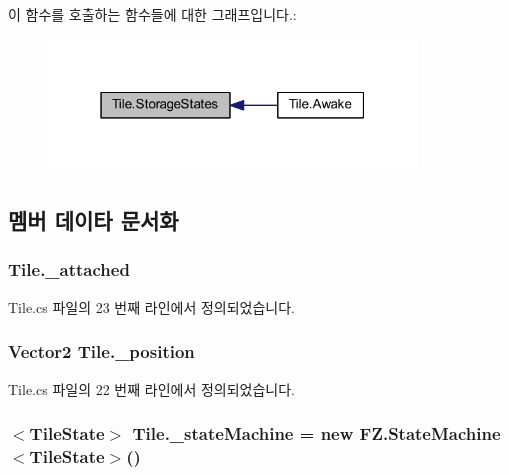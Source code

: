 이 함수를 호출하는 함수들에 대한 그래프입니다.\+:\nopagebreak
\begin{figure}[H]
\begin{center}
\leavevmode
\includegraphics[width=277pt]{class_tile_a6cb69a9fad04bee1fa3473aec22428de_icgraph}
\end{center}
\end{figure}




\subsection{멤버 데이타 문서화}
\subsubsection[{\texorpdfstring{\+\_\+attached}{_attached}}]{ Tile.\+\_\+attached\hspace{0.3cm}{\ttfamily [private]}}\hypertarget{class_tile_aa6874cba770df8eeb24e2ac47c749389}{}\label{class_tile_aa6874cba770df8eeb24e2ac47c749389}


Tile.\+cs 파일의 23 번째 라인에서 정의되었습니다.

\subsubsection[{\texorpdfstring{\+\_\+position}{_position}}]{\setlength{\rightskip}{0pt plus 5cm}Vector2 Tile.\+\_\+position\hspace{0.3cm}{\ttfamily [private]}}\hypertarget{class_tile_a56d02616cede51da0afdceff82ca958d}{}\label{class_tile_a56d02616cede51da0afdceff82ca958d}


Tile.\+cs 파일의 22 번째 라인에서 정의되었습니다.

\subsubsection[{\texorpdfstring{\+\_\+state\+Machine}{_stateMachine}}]{$<${\bf Tile\+State}$>$ Tile.\+\_\+state\+Machine = new {\bf F\+Z.\+State\+Machine}$<${\bf Tile\+State}$>$()\hspace{0.3cm}{\ttfamily [private]}}\hypertarget{class_tile_a6e1fc020bb66550bfe40c40a18e56910}{}\label{class_tile_a6e1fc020bb66550bfe40c40a18e56910}



